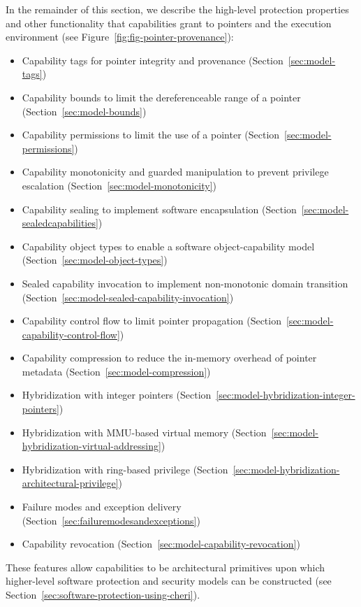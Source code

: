 In the remainder of this section, we describe the high-level protection
properties and other functionality that capabilities grant to pointers and
the execution environment (see Figure~\ref{fig:fig-pointer-provenance}):

\begin{itemize}
\item Capability tags for pointer integrity and provenance
  (Section~\ref{sec:model-tags})
\item Capability bounds to limit the dereferenceable range of a pointer
  (Section~\ref{sec:model-bounds})
\item Capability permissions to limit the use of a pointer
  (Section~\ref{sec:model-permissions})
\item Capability monotonicity and guarded manipulation to prevent privilege
  escalation (Section~\ref{sec:model-monotonicity})
\item Capability sealing to implement software encapsulation
  (Section~\ref{sec:model-sealedcapabilities})
\item Capability object types to enable a software object-capability model
  (Section~\ref{sec:model-object-types})
\item Sealed capability invocation to implement non-monotonic domain
  transition (Section~\ref{sec:model-sealed-capability-invocation})
\item Capability control flow to limit pointer propagation
  (Section~\ref{sec:model-capability-control-flow})
\item Capability compression to reduce the in-memory overhead of pointer
  metadata (Section~\ref{sec:model-compression})
\item Hybridization with integer pointers
  (Section~\ref{sec:model-hybridization-integer-pointers})
\item Hybridization with MMU-based virtual memory
  (Section~\ref{sec:model-hybridization-virtual-addressing})
\item Hybridization with ring-based privilege
  (Section~\ref{sec:model-hybridization-architectural-privilege})
\item Failure modes and exception delivery
  (Section~\ref{sec:failuremodesandexceptions})
\item Capability revocation (Section~\ref{sec:model-capability-revocation})
\end{itemize}

\noindent
These features allow capabilities to be architectural primitives upon which
higher-level software protection and security models can be constructed (see
Section~\ref{sec:software-protection-using-cheri}).

